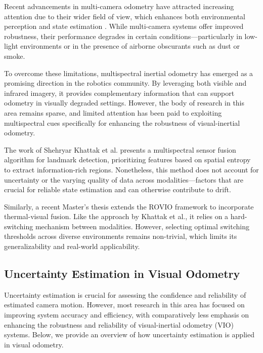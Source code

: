 Recent advancements in multi-camera odometry have attracted increasing attention due to their wider field of view, which enhances both environmental perception and state estimation \cite{yang2021asynchronous}. While multi-camera systems offer improved robustness, their performance degrades in certain conditions—particularly in low-light environments or in the presence of airborne obscurants such as dust or smoke.

To overcome these limitations, multispectral inertial odometry has emerged as a promising direction in the robotics community. By leveraging both visible and infrared imagery, it provides complementary information that can support odometry in visually degraded settings. However, the body of research in this area remains sparse, and limited attention has been paid to exploiting multispectral cues specifically for enhancing the robustness of visual-inertial odometry.

The work of Shehryar Khattak et al. \cite{Khattak2019} presents a multispectral sensor fusion algorithm for landmark detection, prioritizing features based on spatial entropy to extract information-rich regions. Nonetheless, this method does not account for uncertainty or the varying quality of data across modalities—factors that are crucial for reliable state estimation and can otherwise contribute to drift.

Similarly, a recent Master's thesis \cite{flemmen2021rovtio} extends the ROVIO framework to incorporate thermal-visual fusion. Like the approach by Khattak et al., it relies on a hard-switching mechanism between modalities. However, selecting optimal switching thresholds across diverse environments remains non-trivial, which limits its generalizability and real-world applicability.




\subsection{Uncertainty Estimation in Visual Odometry}

Uncertainty estimation is crucial for assessing the confidence and reliability of estimated camera motion. However, most research in this area has focused on improving system accuracy and efficiency, with comparatively less emphasis on enhancing the robustness and reliability of visual-inertial odometry (VIO) systems. Below, we provide an overview of how uncertainty estimation is applied in visual odometry.

